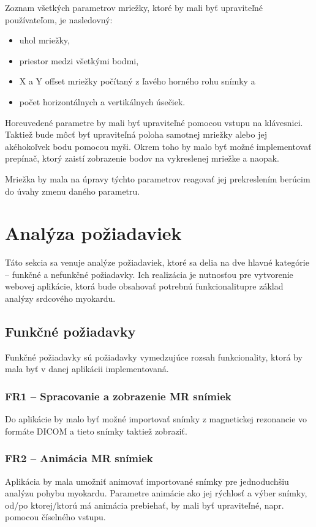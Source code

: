 Zoznam všetkých parametrov mriežky, ktoré by mali byť upraviteľné používateľom, je nasledovný:
\begin {itemize}
\item {uhol mriežky,}
\item {priestor medzi všetkými bodmi,}
\item {X a Y offset mriežky počítaný z ľavého horného rohu snímky a}
\item {počet horizontálnych a vertikálnych úsečiek.}
\end {itemize}

Horeuvedené parametre by mali byť upraviteľné pomocou vstupu na klávesnici.
Taktiež bude môcť byť upraviteľná poloha samotnej mriežky alebo jej akéhokoľvek bodu pomocou myši. Okrem toho by malo byť možné implementovať prepínač, ktorý zaistí zobrazenie  bodov na vykreslenej mriežke a naopak.

Mriežka by mala na úpravy týchto parametrov reagovať jej prekreslením berúcim do úvahy zmenu daného parametru.

\section {Analýza požiadaviek}
Táto sekcia sa venuje analýze požiadaviek, ktoré sa delia na dve hlavné kategórie -- funkčné a nefunkčné požiadavky. Ich realizácia je nutnosťou pre vytvorenie webovej aplikácie, ktorá bude obsahovať potrebnú funkcionalitu\newline pre základ analýzy srdcového myokardu.

\subsection {Funkčné požiadavky}
Funkčné požiadavky sú požiadavky vymedzujúce rozsah funkcionality, ktorá by mala byť v danej aplikácii implementovaná.

\subsubsection {FR1 -- Spracovanie a zobrazenie MR snímiek}\label{fr1}
Do aplikácie by malo byť možné importovať snímky z magnetickej rezonancie vo formáte DICOM a tieto snímky taktiež zobraziť.

\subsubsection {FR2 -- Animácia MR snímiek}\label{fr2}
Aplikácia by mala umožniť animovať importované snímky pre jednoduchšiu analýzu pohybu myokardu. Parametre animácie ako jej rýchlosť a výber snímky, od/po ktorej/ktorú má animácia prebiehať, by mali byť upraviteľné, napr. pomocou číselného vstupu.

